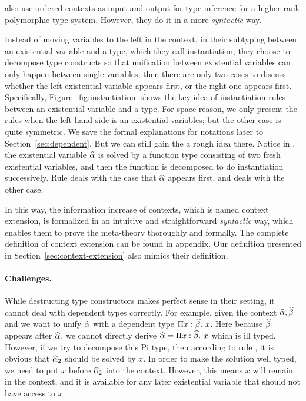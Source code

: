 \citet{dunfield2013complete} also use ordered contexts as input and output for
type inference for a higher rank polymorphic type system. However, they do it in
a more \textit{syntactic} way.

Instead of moving variables to the left in the context, in their subtyping
between an existential variable and a type, which they call instantiation, they
choose to decompose type constructs so that unification between existential
variables can only happen between single variables,
 then there are only two cases to discuss: whether the left
existential variable appears first, or the right one appears first.
Specifically, Figure~\ref{fig:instantiation} shows the key idea of instantiation
rules between an existential variable and a type. For space reason, we only
present the rules when the left hand side is an existential variables; but the
other case is quite symmetric. We save the formal explanations for notations
later to Section~\ref{sec:dependent}. But we can still gain the a rough idea
there. Notice in , the existential variable $\widehat{\alpha}$ is solved by a
function type consisting of two fresh existential variables, and then the
function is decomposed to do instantiation successively. Rule 
deals with the case that $\widehat{\alpha}$ appears first, and  deals with the
other case.

In this way, the information increase of contexts, which is named context
extension, is formalized in an intuitive and straightforward \textit{syntactic}
way, which enables them to prove the meta-theory thoroughly and formally.
The complete definition of context extension can be found in appendix. Our
definition presented in Section~\ref{sec:context-extension} also mimics their
definition.

\paragraph{Challenges.} While destructing type constructors makes perfect sense
in their setting, it cannot deal with dependent types correctly. For example,
given the context $\widehat{\alpha}, \widehat{\beta}$ and we want to unify $\widehat{\alpha}$ with a dependent
type $\Pi x:\widehat{\beta}.~ x$. Here because $\widehat{\beta}$ appears after $\widehat{\alpha}$, we cannot
directly derive $\widehat{\alpha} = \Pi x:\widehat{\beta}.~ x$ which is ill typed. However, if we try
to decompose this Pi type, then according to rule , it is obvious
that $\widehat{\alpha}_2$ should be solved by $x$. In order to make the solution well
typed, we need to put $x$ before $\widehat{\alpha}_2$ into the context. However, this means
$x$ will remain in the context, and it is available for any later existential
variable that should not have access to $x$.

